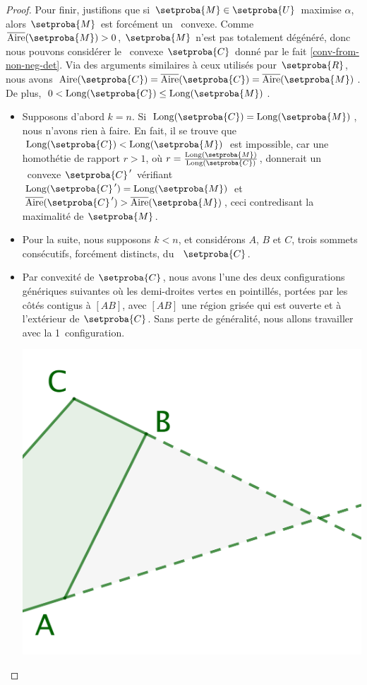 \begin{proof}
    
    Pour finir, justifions que si $\setproba{M} \in \setproba{U}$ maximise $\alpha$, alors $\setproba{M}$ est forcément un \ngone\ convexe. 
    Comme $\sarea{\setproba{M}} > 0$, $\setproba{M}$ n'est pas totalement dégénéré,
    donc nous pouvons considérer le \kgone\ convexe $\setproba{C}$ donné par le fait \ref{conv-from-non-neg-det}.
    Via des arguments similaires à ceux utilisés pour $\setproba{R}$, 
    nous avons $\area{\setproba{C}} = \sarea{\setproba{C}} = \sarea{\setproba{M}}$.
    De plus,
    $0 < \cyclelen{\setproba{C}} \leq \cyclelen{\setproba{M}}$.
    \begin{itemize}
		\item Supposons d'abord $k = n$.
		Si $\cyclelen{\setproba{C}} = \cyclelen{\setproba{M}}$, nous n'avons rien à faire.
		En fait, il se trouve que $\cyclelen{\setproba{C}} < \cyclelen{\setproba{M}}$ est impossible, 
		car une homothétie de rapport $r > 1$, où $r = \frac{ \cyclelen{\setproba{M}} }{ \cyclelen{\setproba{C}} }$, donnerait un \ngone\ convexe $\primeit{\setproba{C}}$ vérifiant
		$\cyclelen{\primeit{\setproba{C}}} = \cyclelen{\setproba{M}}$
		et
		$\sarea{\primeit{\setproba{C}}} > \sarea{\setproba{M}}$, ceci contredisant la maximalité de $\setproba{M}$.


		\item Pour la suite, nous supposons $k < n$, et considérons $A$, $B$ et $C$, trois sommets consécutifs, forcément distincts, du \kgone\ $\setproba{C}$. 


		\item Par convexité de $\setproba{C}$, nous avons l'une des deux configurations génériques suivantes où les demi-droites vertes en pointillés, portées par les côtés contigus à $[AB]$,  avec $[AB]$ une région grisée qui est ouverte et à l'extérieur de $\setproba{C}$. 
		Sans perte de généralité, nous allons travailler avec la 1\iere\ configuration.
		\begin{multicols}{2}
			\centering

			\includegraphics[scale=.35]{content/polygon/at-least-one/add-vertex-1.png}


\end{multicols}
\end{itemize}
\end{proof}
